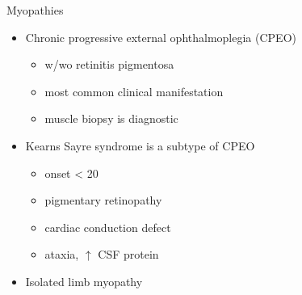 \documentclass[presentation, smaller]{beamer}
\begin{document}
\begin{frame}[label={sec:org6600467}]{Myopathies}
\begin{itemize}
\item Chronic progressive external ophthalmoplegia (CPEO)
\begin{itemize}
\item w/wo retinitis pigmentosa
\item most common clinical manifestation
\item muscle biopsy is diagnostic
\end{itemize}
\item Kearns Sayre syndrome is a subtype of CPEO
\begin{itemize}
\item onset \textless{} 20
\item pigmentary retinopathy
\item cardiac conduction defect
\item ataxia, \(\uparrow\) CSF protein
\end{itemize}
\item Isolated limb myopathy
\end{itemize}
\end{frame}
\end{document}

